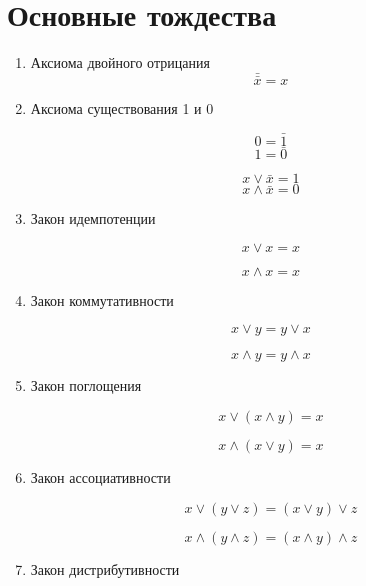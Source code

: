 \section{Основные тождества}
\begin{enumerate}
  \item Аксиома двойного отрицания \\
     $$\bar{\bar{x}} = x$$
  \item Аксиома существования 1 и 0 \\
  \begin{minipage}{5cm}
     $$0 = \bar{1}$$
     $$1 = \bar{0}$$
  \end{minipage}
  \begin{minipage}{5cm}
     $$x \vee \bar{x} = 1$$
     $$x \wedge \bar{x} = 0$$
  \end{minipage}
  \item Закон идемпотенции \\
  \begin{minipage}{5cm}
     $$x \vee x = x$$
  \end{minipage}
  \begin{minipage}{5cm}
     $$x \wedge x = x$$
  \end{minipage}
  \item Закон коммутативности \\
  \begin{minipage}{5cm}
     $$x \vee y = y \vee x$$
  \end{minipage}
  \begin{minipage}{5cm}
     $$x \wedge y = y \wedge x$$
  \end{minipage}
  \item Закон поглощения \\
  \begin{minipage}{5cm}
     $$x \vee (x \wedge y) = x$$
  \end{minipage}
  \begin{minipage}{5cm}
     $$x \wedge (x \vee y) = x$$
  \end{minipage}
  \item Закон ассоциативности \\
  \begin{minipage}{5cm}
     $$x \vee (y \vee z) = (x \vee y) \vee z$$
  \end{minipage}
  \begin{minipage}{5cm}
     $$x \wedge (y \wedge z) = (x \wedge y) \wedge z$$
  \end{minipage}
  \item Закон дистрибутивности \\

\end{enumerate}
